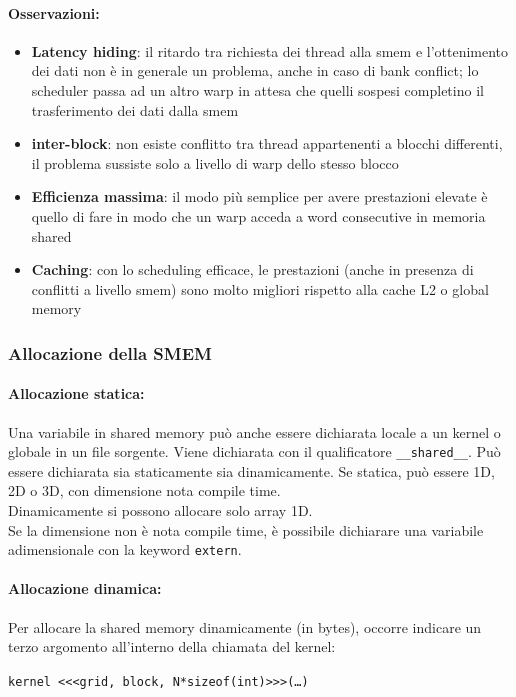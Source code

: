 \paragraph{Osservazioni:}
\begin{itemize}
	\item \textbf{Latency hiding}: il ritardo tra richiesta dei thread alla smem e l'ottenimento dei dati non è in generale un problema, anche in caso di bank conflict; lo scheduler passa ad un altro warp in attesa che quelli sospesi completino il trasferimento dei dati dalla smem
	\item \textbf{inter-block}: non esiste conflitto tra thread appartenenti a blocchi differenti, il problema sussiste solo a livello di warp dello stesso blocco 
	\item \textbf{Efficienza massima}: il modo più semplice per avere prestazioni elevate è quello di fare in modo che un warp acceda a word consecutive in memoria shared
	\item \textbf{Caching}: con lo scheduling efficace, le prestazioni (anche in presenza di conflitti a livello smem) sono molto migliori rispetto alla cache L2 o global memory
\end{itemize}

\newpage

\subsubsection{Allocazione della SMEM}

\paragraph{Allocazione statica:} Una variabile in shared memory può anche essere dichiarata locale a un kernel o globale in un file sorgente. Viene dichiarata con il qualificatore \texttt{\_\_shared\_\_}. Può essere dichiarata sia staticamente sia dinamicamente. Se statica, può essere 1D, 2D o 3D, con dimensione nota compile time.\\
Dinamicamente si possono allocare solo array 1D.\\

Se la dimensione non è nota compile time, è possibile dichiarare una variabile adimensionale con la keyword \texttt{extern}.\\

\paragraph{Allocazione dinamica:} Per allocare la shared memory dinamicamente (in bytes), occorre indicare un terzo argomento all'interno della chiamata del kernel:
\begin{center}
	\texttt{kernel <<<grid, block, N*sizeof(int)>>>(\dots)}
\end{center}



